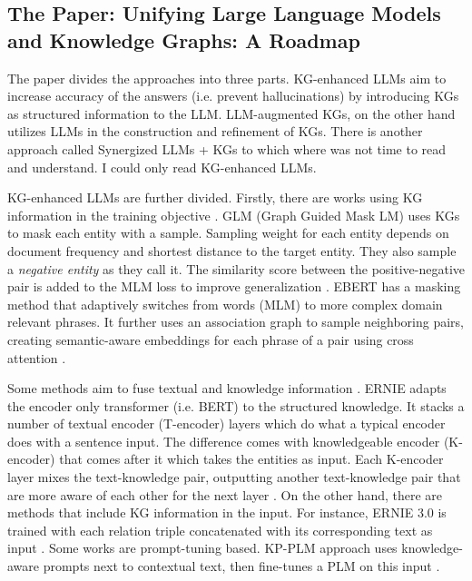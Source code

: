 \documentclass{article}
\begin{document}
\subsection{The Paper: Unifying Large Language Models and Knowledge Graphs: A Roadmap}\label{kgllm}

The paper divides the approaches into three parts. KG-enhanced LLMs aim to increase accuracy of the answers (i.e. prevent hallucinations) by introducing KGs as structured information to the LLM. LLM-augmented KGs, on the other hand utilizes LLMs in the construction and refinement of KGs. There is another approach called Synergized LLMs + KGs \cite{pan_unifying_2024} to which where was not time to read and understand. I could only read KG-enhanced LLMs.

KG-enhanced LLMs are further divided. Firstly, there are works using KG information in the training objective \cite{pan_unifying_2024}. GLM (Graph Guided Mask LM) uses KGs to mask each entity with a sample. Sampling weight for each entity depends on document frequency and shortest distance to the target entity. They also sample a \textit{negative entity} as they call it. The similarity score between the positive-negative pair is added to the MLM loss to improve generalization \cite{shen_exploiting_2020}. EBERT has a masking method that adaptively switches from words (MLM) to more complex domain relevant phrases. It further uses an association graph to sample neighboring pairs, creating semantic-aware embeddings for each phrase of a pair using cross attention \cite{zhang_e-bert_2021}. 

Some methods aim to fuse textual and knowledge information \cite{pan_unifying_2024}. ERNIE adapts the encoder only transformer (i.e. BERT) to the structured knowledge. It stacks a number of textual encoder (T-encoder) layers which do what a typical encoder does with a sentence input. The difference comes with knowledgeable encoder (K-encoder) that comes after it which takes the entities as input. Each K-encoder layer mixes the text-knowledge pair, outputting another text-knowledge pair that are more aware of each other for the next layer \cite{zhang_ernie_2019}. On the other hand, there are methods that include KG information in the input. For instance, ERNIE 3.0 is trained with each relation triple concatenated with its corresponding text as input \cite{sun_ernie_2021}. Some works are prompt-tuning based. KP-PLM approach uses knowledge-aware prompts next to contextual text, then fine-tunes a PLM on this input \cite{wang_knowledge_2022}.
\end{document}
